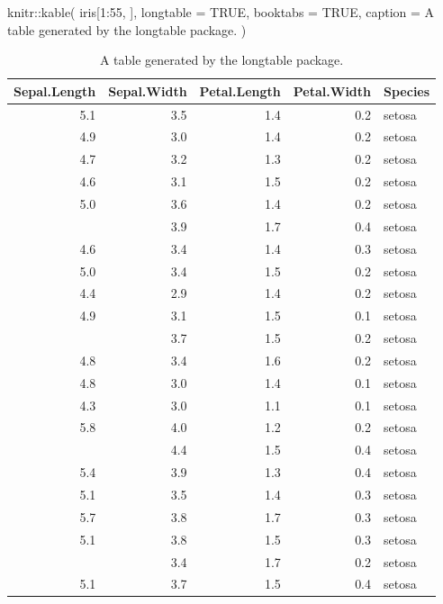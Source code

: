 \documentclass[
  12pt,
]{krantz}
\newenvironment{Shaded}{\begin{snugshade}}{\end{snugshade}}
\newcommand{\AttributeTok}[1]{\textcolor[rgb]{0.77,0.63,0.00}{#1}}
\newcommand{\ConstantTok}[1]{\textcolor[rgb]{0.00,0.00,0.00}{#1}}
\newcommand{\DecValTok}[1]{\textcolor[rgb]{0.00,0.00,0.81}{#1}}
\newcommand{\FunctionTok}[1]{\textcolor[rgb]{0.00,0.00,0.00}{#1}}
\newcommand{\NormalTok}[1]{#1}
\newcommand{\SpecialCharTok}[1]{\textcolor[rgb]{0.00,0.00,0.00}{#1}}
\newcommand{\StringTok}[1]{\textcolor[rgb]{0.31,0.60,0.02}{#1}}
\theoremstyle{definition}
\theoremstyle{definition}
\theoremstyle{definition}
\theoremstyle{definition}
\theoremstyle{remark}
\begin{document}
\begin{Shaded}
\begin{Highlighting}[]
\NormalTok{knitr}\SpecialCharTok{::}\FunctionTok{kable}\NormalTok{(}
\NormalTok{  iris[}\DecValTok{1}\SpecialCharTok{:}\DecValTok{55}\NormalTok{, ], }\AttributeTok{longtable =} \ConstantTok{TRUE}\NormalTok{, }\AttributeTok{booktabs =} \ConstantTok{TRUE}\NormalTok{,}
  \AttributeTok{caption =} \StringTok{\textquotesingle{}A table generated by the longtable package.\textquotesingle{}}
\NormalTok{)}
\end{Highlighting}
\end{Shaded}

\begin{longtable}[t]{rrrrl}
\caption{\label{tab:longtable}A table generated by the longtable package.}\\
\toprule
Sepal.Length & Sepal.Width & Petal.Length & Petal.Width & Species\\
\midrule
5.1 & 3.5 & 1.4 & 0.2 & setosa\\
4.9 & 3.0 & 1.4 & 0.2 & setosa\\
4.7 & 3.2 & 1.3 & 0.2 & setosa\\
4.6 & 3.1 & 1.5 & 0.2 & setosa\\
5.0 & 3.6 & 1.4 & 0.2 & setosa\\
\addlinespace
5.4 & 3.9 & 1.7 & 0.4 & setosa\\
4.6 & 3.4 & 1.4 & 0.3 & setosa\\
5.0 & 3.4 & 1.5 & 0.2 & setosa\\
4.4 & 2.9 & 1.4 & 0.2 & setosa\\
4.9 & 3.1 & 1.5 & 0.1 & setosa\\
\addlinespace
5.4 & 3.7 & 1.5 & 0.2 & setosa\\
4.8 & 3.4 & 1.6 & 0.2 & setosa\\
4.8 & 3.0 & 1.4 & 0.1 & setosa\\
4.3 & 3.0 & 1.1 & 0.1 & setosa\\
5.8 & 4.0 & 1.2 & 0.2 & setosa\\
\addlinespace
5.7 & 4.4 & 1.5 & 0.4 & setosa\\
5.4 & 3.9 & 1.3 & 0.4 & setosa\\
5.1 & 3.5 & 1.4 & 0.3 & setosa\\
5.7 & 3.8 & 1.7 & 0.3 & setosa\\
5.1 & 3.8 & 1.5 & 0.3 & setosa\\
\addlinespace
5.4 & 3.4 & 1.7 & 0.2 & setosa\\
5.1 & 3.7 & 1.5 & 0.4 & setosa\\

\end{longtable}
\end{document}
